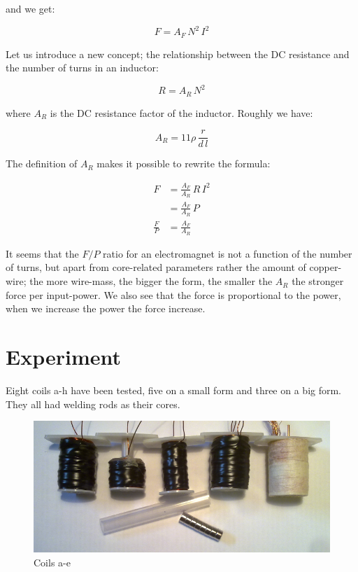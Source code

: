 \documentclass[]{../common/elementary-physics}
\begin{document}
and we get:

\begin{equation}
F = A_F \, N^2 \, I^2
\end{equation}

Let us introduce a new concept; the relationship between the DC resistance and the number of turns in an inductor:

\begin{equation}
R = A_R \, N^2
\end{equation}

where $A_R$ is the DC resistance factor of the inductor.
Roughly we have:

\begin{equation}
A_R = 11 \rho \, \frac{r}{d \, l}
\end{equation}

The definition of $A_R$ makes it possible to rewrite the formula:

\begin{subequations}
\begin{align}
F &= \frac{A_F}{A_R} \, R \, I^2 \\
&= \frac{A_F}{A_R} \, P \\
\frac{F}{P} &= \frac{A_F}{A_R}
\end{align}
\end{subequations}

It seems that the $F/P$ ratio for an electromagnet is not a function of the number of turns, but apart from core-related parameters rather the amount of copper-wire; the more wire-mass, the bigger the form, the smaller the $A_R$ the stronger force per input-power. We also see that the force is proportional to the power, when we increase the power the force increase.

\pagebreak

\section{Experiment}

Eight coils a-h have been tested, five on a small form and three on a big form.
They all had welding rods as their cores.

\begin{figure}[ht] \centering
	\includegraphics[scale=1.7]{coils-a-e} \caption{Coils a-e}
\end{figure}
\end{document}

